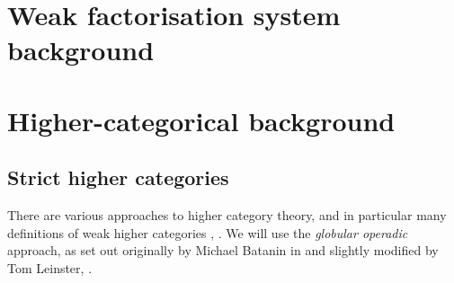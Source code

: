 \section{Weak factorisation system background}



\section{Higher-categorical background}


\subsection{Strict higher categories}

There are various approaches to higher category theory, and in particular many definitions of weak higher categories \cite{leinster:ten-definitions}, \cite{cheng-lauda:guidebook}.  We will use the \emph{globular operadic} approach, as set out originally by Michael Batanin in \cite{batanin:natural-environment} and slightly modified by Tom Leinster, \cite{leinster:book}.

